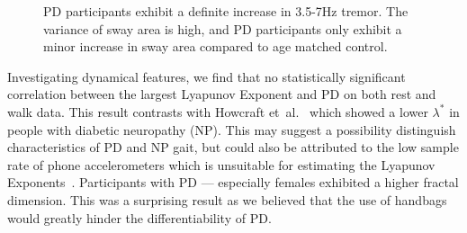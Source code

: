 \documentclass[12pt, twoside]{book}
\begin{document}
\begin{figure}[h]
\begin{subfigure}{.42\textwidth}
	\end{subfigure}
	\caption{PD participants exhibit a definite increase in 3.5-7Hz tremor. The variance of sway area is high, and PD participants only exhibit a minor increase in sway area compared to age matched control. }
	\label{basicrest}
\end{figure}

Investigating dynamical features, we find that no statistically significant correlation between the largest Lyapunov Exponent and PD on both rest and walk data. This result contrasts with Howcraft et~al.~\cite{howcroft2014analysisgaitlyapunov} which showed a lower $\lambda^*$ in people with diabetic neuropathy (NP). This may suggest a possibility distinguish characteristics of PD and NP gait, but could also be attributed to the low sample rate of phone accelerometers which is unsuitable for estimating the Lyapunov Exponents~\cite{rosenstein1993practicallyapunov}. Participants with PD --- especially females exhibited a higher fractal dimension. This was a surprising result as we believed that the use of handbags would greatly hinder the differentiability of PD.
\end{document}
